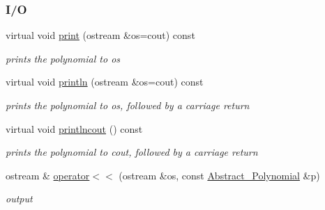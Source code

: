 \subsubsection*{I/O}
\begin{DoxyCompactItemize}
\item 
\mbox{\label{group__polygroup_adbbb6af1fb79d5794af42e28d584641b}} 
virtual void \hyperlink{group__polygroup_adbbb6af1fb79d5794af42e28d584641b}{print} (ostream \&os=cout) const
\begin{DoxyCompactList}\small\item\em prints the polynomial to {\ttfamily os} \end{DoxyCompactList}\item 
\mbox{\label{group__polygroup_a597dc990980f1936e86dbf8940dbeecd}} 
virtual void \hyperlink{group__polygroup_a597dc990980f1936e86dbf8940dbeecd}{println} (ostream \&os=cout) const
\begin{DoxyCompactList}\small\item\em prints the polynomial to {\ttfamily os}, followed by a carriage return \end{DoxyCompactList}\item 
\mbox{\label{group__polygroup_a69dfd6bd725e126d2476826fb345c5f6}} 
virtual void \hyperlink{group__polygroup_a69dfd6bd725e126d2476826fb345c5f6}{printlncout} () const
\begin{DoxyCompactList}\small\item\em prints the polynomial to {\ttfamily cout}, followed by a carriage return \end{DoxyCompactList}\item 
\mbox{\label{group__polygroup_aadc14212f0cbdb81df9977916cc13798}} 
ostream \& \hyperlink{group__polygroup_aadc14212f0cbdb81df9977916cc13798}{operator$<$$<$} (ostream \&os, const \hyperlink{group__polygroup_class_abstract___polynomial}{Abstract\+\_\+\+Polynomial} \&p)
\begin{DoxyCompactList}\small\item\em output \end{DoxyCompactList}\end{DoxyCompactItemize}


